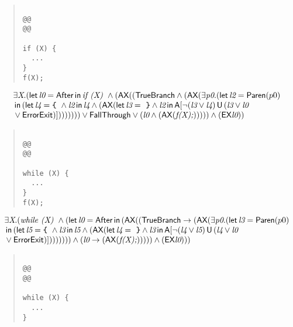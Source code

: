 \documentclass{article}
\newcommand{\U}{\,\mbox{\sf{U}}\,}
\newcommand{\A}{\mbox{\sf{A}}}
\newcommand{\AX}{\mbox{\sf{AX}}}
\newcommand{\EX}{\mbox{\sf{EX}}}
\newcommand{\mita}[1]{\mbox{\it{{#1}}}}
\newcommand{\msf}[1]{\mbox{\sf{{#1}}}}
\newcommand{\ttlb}{\mbox{\tt \char'173}}
\newcommand{\ttrb}{\mbox{\tt \char'175}}
\begin{document}
\begin{quote}\begin{verbatim}

@@
@@

if (X) {
  ...
}
f(X);
\end{verbatim}\end{quote}

\[\begin{array}{l}
\exists \mita{X} . (\mita{\sf{let}} \, \mita{l0} = \msf{After} \, \mita{\sf{in}} \, \mita{if (X) } \wedge (\AX((\msf{TrueBranch} \wedge (\AX(\exists \mita{p0} . (\mita{\sf{let}} \, \mita{l2} = \msf{Paren}(p0)\\\mbox{} \, \mita{\sf{in}} \, (\mita{\sf{let}} \, \mita{l4} = \mita{{\ttlb}
  } \wedge \mita{l2} \, \mita{\sf{in}} \, \mita{l4} \wedge (\AX(\mita{\sf{let}} \, \mita{l3} = \mita{
{\ttrb}} \wedge \mita{l2} \, \mita{\sf{in}} \, \A[\neg (\mita{l3} \vee \mita{l4}) \U (\mita{l3} \vee \mita{l0}\\\mbox{} \vee \msf{ErrorExit})]

))
)
)))) \vee \msf{FallThrough} \vee (\mita{l0} \wedge (\AX(\mita{f(X);}))))) \wedge (\EX\mita{l0})
)
\end{array}\]

\begin{quote}\begin{verbatim}

@@
@@

while (X) {
  ...
}
f(X);
\end{verbatim}\end{quote}

\[\begin{array}{l}
\exists \mita{X} . (\mita{while (X) } \wedge (\mita{\sf{let}} \, \mita{l0} = \msf{After} \, \mita{\sf{in}} \, (\AX((\msf{TrueBranch} \rightarrow (\AX(\exists \mita{p0} . (\mita{\sf{let}} \, \mita{l3} = \msf{Paren}(p0)\\\mbox{} \, \mita{\sf{in}} \, (\mita{\sf{let}} \, \mita{l5} = \mita{{\ttlb}
  } \wedge \mita{l3} \, \mita{\sf{in}} \, \mita{l5} \wedge (\AX(\mita{\sf{let}} \, \mita{l4} = \mita{
{\ttrb}} \wedge \mita{l3} \, \mita{\sf{in}} \, \A[\neg (\mita{l4} \vee \mita{l5}) \U (\mita{l4} \vee \mita{l0}\\\mbox{} \vee \msf{ErrorExit})]

))
)
)))) \wedge (\mita{l0} \rightarrow (\AX(\mita{f(X);}))))) \wedge (\EX\mita{l0})
))
\end{array}\]

\begin{quote}\begin{verbatim}

@@
@@

while (X) {
  ...
}
\end{verbatim}\end{quote}
\end{document}
